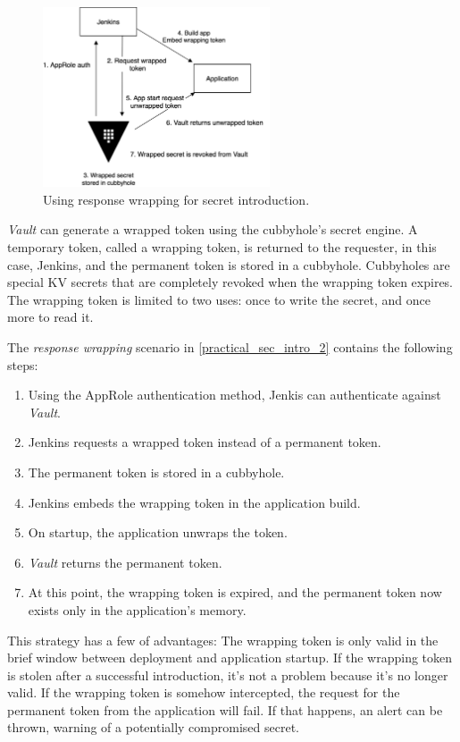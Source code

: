 \documentclass[runningheads]{llncs}
\begin{document}
\begin{figure}
    \centering
    \includegraphics[width=0.6\textwidth]{images/nsip_pracitcal_sec_intro_2.png}
    \caption{Using response wrapping for secret introduction.}
    \label{practical_sec_intro_2}
\end{figure}

\textit{Vault} can generate a wrapped token using the cubbyhole's secret engine. A temporary token, called a wrapping token, is returned to the requester, in this case, Jenkins, and the permanent token is stored in a cubbyhole. Cubbyholes are special KV secrets that are completely revoked when the wrapping token expires. The wrapping token is limited to two uses: once to write the secret, and once more to read it.

The \textit{response wrapping} scenario in \autoref{practical_sec_intro_2} contains the following steps:

\begin{enumerate}
    \setlength\itemsep{1mm}
    \item Using the AppRole authentication method, Jenkis can authenticate against \textit{Vault}.
    \item Jenkins requests a wrapped token instead of a permanent token. 
    \item The permanent token is stored in a cubbyhole.
    \item Jenkins embeds the wrapping token in the application build. 
    \item On startup, the application unwraps the token. 
    \item \textit{Vault} returns the permanent token. 
    \item At this point, the wrapping token is expired, and the permanent token now exists only in the application's memory.
\end{enumerate}

This strategy has a few of advantages: The wrapping token is only valid in the brief window between deployment and application startup. If the wrapping token is stolen after a successful introduction, it's not a problem because it's no longer valid. If the wrapping token is somehow intercepted, the request for the permanent token from the application will fail. If that happens, an alert can be thrown, warning of a potentially compromised secret.
\end{document}
